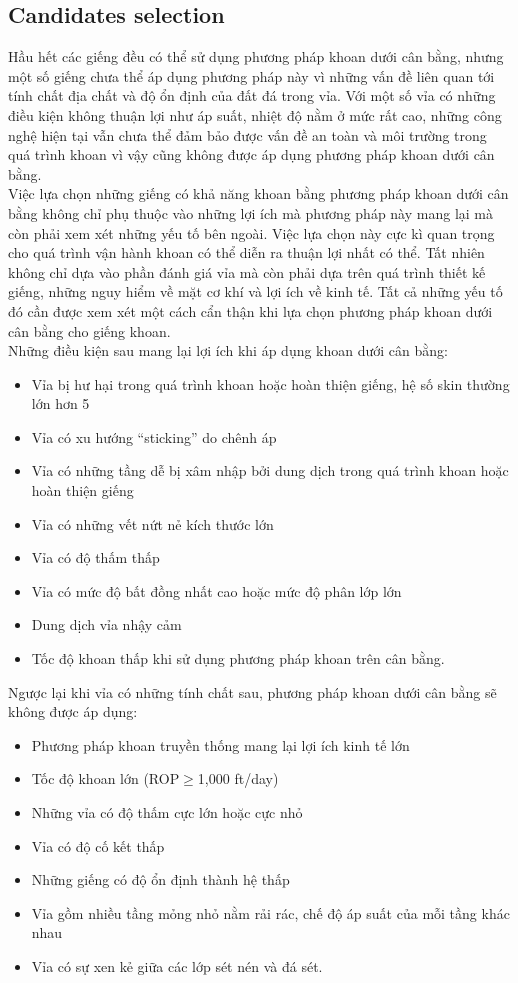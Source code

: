 \documentclass[12pt,a4paper]{article}
\begin{document}
\subsection{Candidates selection}
	Hầu hết các giếng đều có thể sử dụng phương pháp khoan dưới cân bằng, nhưng một số giếng chưa thể áp dụng phương pháp này vì những vấn đề liên quan tới tính chất địa chất và độ ổn định của đất đá trong vỉa. Với một số vỉa có những điều kiện không thuận lợi như áp suất, nhiệt độ nằm ở mức rất cao, những công nghệ hiện tại vẫn chưa thể đảm bảo được vấn đề an toàn và môi trường trong quá trình khoan vì vậy cũng không được áp dụng phương pháp khoan dưới cân bằng\cite{guo2002gas}. \\
	Việc lựa chọn những giếng có khả năng khoan bằng phương pháp khoan dưới cân bằng không chỉ phụ thuộc vào những lợi ích mà phương pháp này mang lại mà còn phải xem xét những yếu tố bên ngoài. Việc lựa chọn này cực kì quan trọng cho quá trình vận hành khoan có thể diễn ra thuận lợi nhất có thể. Tất nhiên không chỉ dựa vào phần đánh giá vỉa mà còn phải dựa trên quá trình thiết kế giếng, những nguy hiểm về mặt cơ khí và lợi ích về kinh tế. Tất cả những yếu tố đó cần được xem xét một cách cẩn thận khi lựa chọn phương pháp khoan dưới cân bằng cho giếng khoan.\\
	Những điều kiện sau mang lại lợi ích khi áp dụng khoan dưới cân bằng:
	\begin{itemize}
		\item Vỉa bị hư hại trong quá trình khoan hoặc hoàn thiện giếng, hệ số skin thường lớn hơn 5
		\item Vỉa có xu hướng ``sticking'' do chênh áp\newline
		\item Vỉa có những tầng dễ bị xâm nhập bởi dung dịch trong quá trình khoan hoặc hoàn thiện giếng
		\item Vỉa có những vết nứt nẻ kích thước lớn
		\item Vỉa có độ thấm thấp
		\item Vỉa có mức độ bất đồng nhất cao hoặc mức độ phân lớp lớn
		\item Dung dịch vỉa nhậy cảm
		\item Tốc độ khoan thấp khi sử dụng phương pháp khoan trên cân bằng.
	\end{itemize}
	Ngược lại khi vỉa có những tính chất sau, phương pháp khoan dưới cân bằng sẽ không được áp dụng:
	\begin{itemize}
		\item Phương pháp khoan truyền thống mang lại lợi ích kinh tế lớn
		\item Tốc độ khoan lớn (ROP$\geq$1,000 ft/day)
		\item Những vỉa có độ thấm cực lớn hoặc cực nhỏ
		\item Vỉa có độ cố kết thấp
		\item Những giếng có độ ổn định thành hệ thấp
		\item Vỉa gồm nhiều tầng mỏng nhỏ nằm rải rác, chế độ áp suất của mỗi tầng khác nhau
		\item Vỉa có sự xen kẻ giữa các lớp sét nén và đá sét.
	\end{itemize}
\end{document}
